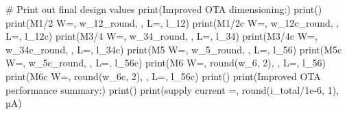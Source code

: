 \documentclass[
  a4paper,
  DIV=11,
  numbers=noendperiod]{scrartcl}
\newenvironment{Shaded}{\begin{snugshade}}{\end{snugshade}}
\newcommand{\BuiltInTok}[1]{\textcolor[rgb]{0.00,0.23,0.31}{#1}}
\newcommand{\CommentTok}[1]{\textcolor[rgb]{0.37,0.37,0.37}{#1}}
\newcommand{\DecValTok}[1]{\textcolor[rgb]{0.68,0.00,0.00}{#1}}
\newcommand{\FloatTok}[1]{\textcolor[rgb]{0.68,0.00,0.00}{#1}}
\newcommand{\NormalTok}[1]{\textcolor[rgb]{0.00,0.23,0.31}{#1}}
\newcommand{\OperatorTok}[1]{\textcolor[rgb]{0.37,0.37,0.37}{#1}}
\newcommand{\StringTok}[1]{\textcolor[rgb]{0.13,0.47,0.30}{#1}}
\begin{document}
\begin{tcolorbox}
\begin{Shaded}
\begin{Highlighting}[]
\CommentTok{\# Print out final design values}
\BuiltInTok{print}\NormalTok{(}\StringTok{\textquotesingle{}Improved OTA dimensioning:\textquotesingle{}}\NormalTok{)}
\BuiltInTok{print}\NormalTok{(}\StringTok{\textquotesingle{}{-}{-}{-}{-}{-}{-}{-}{-}{-}{-}{-}{-}{-}{-}{-}{-}{-}{-}{-}{-}{-}{-}{-}{-}{-}{-}\textquotesingle{}}\NormalTok{)}
\BuiltInTok{print}\NormalTok{(}\StringTok{\textquotesingle{}M1/2  W=\textquotesingle{}}\NormalTok{, w\_12\_round, }\StringTok{\textquotesingle{}, L=\textquotesingle{}}\NormalTok{, l\_12)}
\BuiltInTok{print}\NormalTok{(}\StringTok{\textquotesingle{}M1/2c W=\textquotesingle{}}\NormalTok{, w\_12c\_round, }\StringTok{\textquotesingle{}, L=\textquotesingle{}}\NormalTok{, l\_12c)}
\BuiltInTok{print}\NormalTok{(}\StringTok{\textquotesingle{}M3/4  W=\textquotesingle{}}\NormalTok{, w\_34\_round, }\StringTok{\textquotesingle{}, L=\textquotesingle{}}\NormalTok{, l\_34)}
\BuiltInTok{print}\NormalTok{(}\StringTok{\textquotesingle{}M3/4c W=\textquotesingle{}}\NormalTok{, w\_34c\_round, }\StringTok{\textquotesingle{}, L=\textquotesingle{}}\NormalTok{, l\_34c)}
\BuiltInTok{print}\NormalTok{(}\StringTok{\textquotesingle{}M5   W=\textquotesingle{}}\NormalTok{, w\_5\_round, }\StringTok{\textquotesingle{}, L=\textquotesingle{}}\NormalTok{, l\_56)}
\BuiltInTok{print}\NormalTok{(}\StringTok{\textquotesingle{}M5c  W=\textquotesingle{}}\NormalTok{, w\_5c\_round, }\StringTok{\textquotesingle{}, L=\textquotesingle{}}\NormalTok{, l\_56c)}
\BuiltInTok{print}\NormalTok{(}\StringTok{\textquotesingle{}M6   W=\textquotesingle{}}\NormalTok{, }\BuiltInTok{round}\NormalTok{(w\_6, }\DecValTok{2}\NormalTok{), }\StringTok{\textquotesingle{}, L=\textquotesingle{}}\NormalTok{, l\_56)}
\BuiltInTok{print}\NormalTok{(}\StringTok{\textquotesingle{}M6c  W=\textquotesingle{}}\NormalTok{, }\BuiltInTok{round}\NormalTok{(w\_6c, }\DecValTok{2}\NormalTok{), }\StringTok{\textquotesingle{}, L=\textquotesingle{}}\NormalTok{, l\_56c)}
\BuiltInTok{print}\NormalTok{()}
\BuiltInTok{print}\NormalTok{(}\StringTok{\textquotesingle{}Improved OTA performance summary:\textquotesingle{}}\NormalTok{)}
\BuiltInTok{print}\NormalTok{(}\StringTok{\textquotesingle{}{-}{-}{-}{-}{-}{-}{-}{-}{-}{-}{-}{-}{-}{-}{-}{-}{-}{-}{-}{-}{-}{-}{-}{-}{-}{-}{-}{-}{-}{-}{-}{-}{-}\textquotesingle{}}\NormalTok{)}
\BuiltInTok{print}\NormalTok{(}\StringTok{\textquotesingle{}supply current =\textquotesingle{}}\NormalTok{, }\BuiltInTok{round}\NormalTok{(i\_total}\OperatorTok{/}\FloatTok{1e{-}6}\NormalTok{, }\DecValTok{1}\NormalTok{), }\StringTok{\textquotesingle{}µA\textquotesingle{}}\NormalTok{)}

\end{Highlighting}
\end{Shaded}
\end{tcolorbox}
\end{document}
